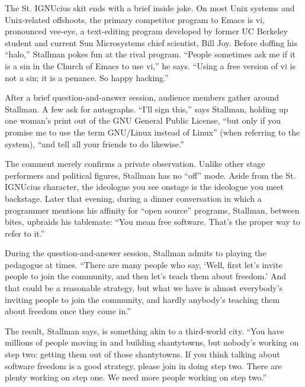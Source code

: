 The St. IGNUcius skit ends with a brief inside joke. On most Unix systems and Unix-related offshoots, the primary competitor program to Emacs is vi, pronounced vee-eye, a text-editing program developed by former UC Berkeley student and current Sun Microsystems chief scientist, Bill Joy. Before doffing his ``halo,'' Stallman pokes fun at the rival program. ``People sometimes ask me if it is a sin in the Church of Emacs to use vi,'' he says. ``Using a free version of vi is not a sin; it is a penance. So happy hacking.''

After a brief question-and-answer session, audience members gather around Stallman. A few ask for autographs. ``I'll sign this,'' says Stallman, holding up one woman's print out of the GNU General Public License, ``but only if you promise me to use the term GNU/Linux instead of Linux'' (when referring to the system), ``and tell all your friends to do likewise.''

The comment merely confirms a private observation. Unlike other stage performers and political figures, Stallman has no ``off'' mode. Aside from the St. IGNUcius character, the ideologue you see onstage is the ideologue you meet backstage. Later that evening, during a dinner conversation in which a programmer mentions his affinity for ``open source'' programs, Stallman, between bites, upbraids his tablemate: ``You mean free software. That's the proper way to refer to it.''

During the question-and-answer session, Stallman admits to playing the pedagogue at times. ``There are many people who say, `Well, first let's invite people to join the community, and then let's teach them about freedom.' And that could be a reasonable strategy, but what we have is almost everybody's inviting people to join the community, and hardly anybody's teaching them about freedom once they come in.''

The result, Stallman says, is something akin to a third-world city. ``You have millions of people moving in and building shantytowns, but nobody's working on step two: getting them out of those shantytowns. If you think talking about software freedom is a good strategy, please join in doing step two. There are plenty working on step one. We need more people working on step two.''

